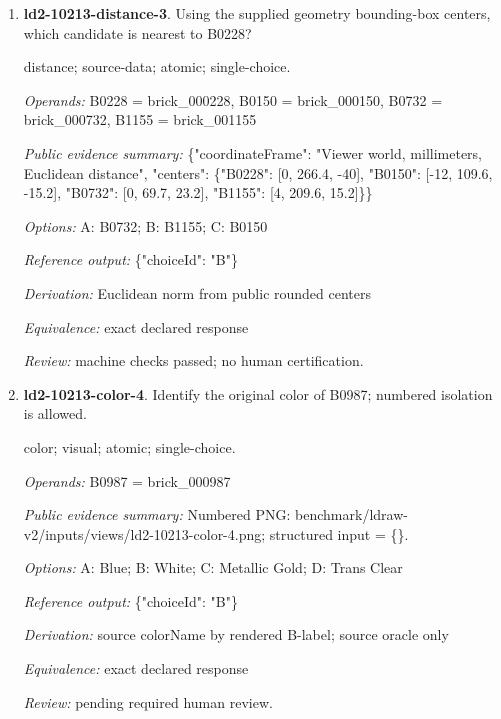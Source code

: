 \begin{enumerate}
\par{\small shape-match; visual; atomic; single-choice.\par\textit{Operands:} B0921 = brick\_000921, B0237 = brick\_000237, B0228 = brick\_000228, B0303 = brick\_000303, B1084 = brick\_001084\par\textit{Public evidence summary:} Numbered PNG: benchmark/ldraw-v2/inputs/views/ld2-10213-shape-match-3.png; structured input = \{\}.\par\textit{Options:} A: B0237; B: B0921; C: B0303; D: B1084\par\textit{Reference output:} \{"choiceId": "C"\}\par\textit{Derivation:} source partNumber equality across labeled candidates; source oracle only\par\textit{Equivalence:} same source partNumber; ignore color and pose; perceptual equivalence pending\par\textit{Review:} pending required human review.}
\item \textbf{ld2-10213-distance-3}. Using the supplied geometry bounding-box centers, which candidate is nearest to B0228?
\par{\small distance; source-data; atomic; single-choice.\par\textit{Operands:} B0228 = brick\_000228, B0150 = brick\_000150, B0732 = brick\_000732, B1155 = brick\_001155\par\textit{Public evidence summary:} \{"coordinateFrame": "Viewer world, millimeters, Euclidean distance", "centers": \{"B0228": [0, 266.4, -40], "B0150": [-12, 109.6, -15.2], "B0732": [0, 69.7, 23.2], "B1155": [4, 209.6, 15.2]\}\}\par\textit{Options:} A: B0732; B: B1155; C: B0150\par\textit{Reference output:} \{"choiceId": "B"\}\par\textit{Derivation:} Euclidean norm from public rounded centers\par\textit{Equivalence:} exact declared response\par\textit{Review:} machine checks passed; no human certification.}
\item \textbf{ld2-10213-color-4}. Identify the original color of B0987; numbered isolation is allowed.
\par{\small color; visual; atomic; single-choice.\par\textit{Operands:} B0987 = brick\_000987\par\textit{Public evidence summary:} Numbered PNG: benchmark/ldraw-v2/inputs/views/ld2-10213-color-4.png; structured input = \{\}.\par\textit{Options:} A: Blue; B: White; C: Metallic Gold; D: Trans Clear\par\textit{Reference output:} \{"choiceId": "B"\}\par\textit{Derivation:} source colorName by rendered B-label; source oracle only\par\textit{Equivalence:} exact declared response\par\textit{Review:} pending required human review.}

\end{enumerate}
